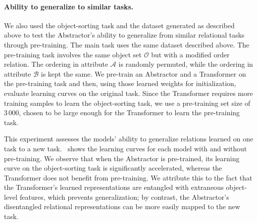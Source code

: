 \paragraph{Ability to generalize to similar tasks.}
We also used the object-sorting task and the dataset generated as described above to test the Abstractor's ability to generalize from similar relational tasks through pre-training. The main task uses the same dataset described above. The pre-training task involves the same object set $\mathcal{O}$ but with a modified order relation. The ordering in attribute $\mathcal{A}$ is randomly permuted, while the ordering in attribute $\mathcal{B}$ is kept the same. %
We pre-train an Abstractor and a Transformer on the pre-training task and then, using those learned weights for initialization, evaluate learning curves on the original task. Since the Transformer requires more training samples to learn the object-sorting task, we use a pre-training set size of $3\,000$, chosen to be large enough for the Transformer to learn the pre-training task.

This experiment assesses the models' ability to generalize relations learned on one task to a new task.~ shows the learning curves for each model with and without pre-training. We observe that when the Abstractor is pre-trained, its learning curve on the object-sorting task is significantly accelerated, whereas the Transformer does not benefit from pre-training. We attribute this to the fact that the Transformer's learned representations are entangled with extraneous object-level features, which prevents generalization; by contrast, the Abstractor's disentangled relational representations can be more easily mapped to the new task.
